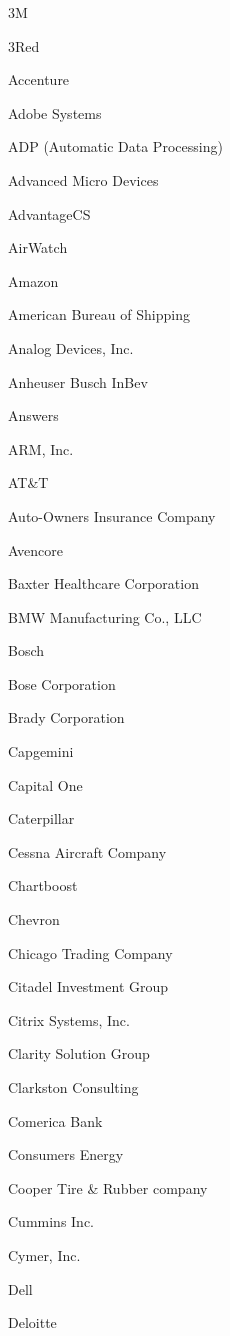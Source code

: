 \documentclass[twoside]{article}
\begin{document}
\begin{center}
\begin{multicols}{5}
        \begin{FlushLeft}
        \begin{compactitem}
        \item 3M
\item 3Red
\item Accenture
\item Adobe Systems
\item ADP (Automatic Data Processing)
\item Advanced Micro Devices
\item AdvantageCS
\item AirWatch
\item Amazon
\item American Bureau of Shipping
\item Analog Devices, Inc.
\item Anheuser Busch InBev
\item Answers
\item ARM, Inc.
\item AT\&T
\item Auto-Owners Insurance Company
\item Avencore
\item Baxter Healthcare Corporation
\item BMW Manufacturing Co., LLC
\item Bosch
\item Bose Corporation
\item Brady Corporation
\item Capgemini
\item Capital One
\item Caterpillar
\item Cessna Aircraft Company
\item Chartboost
\item Chevron
\item Chicago Trading Company
\item Citadel Investment Group
\item Citrix Systems, Inc.
\item Clarity Solution Group
\item Clarkston Consulting
\item Comerica Bank
\item Consumers Energy
\item Cooper Tire \& Rubber company
\item Cummins Inc.
\item Cymer, Inc.
\item Dell
\item Deloitte

\end{compactitem}
\end{FlushLeft}
\end{multicols}
\end{center}
\end{document}

